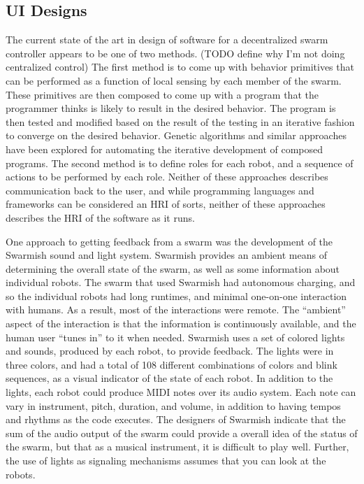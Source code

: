 \documentclass[]{article}
\begin{document}
\subsection{UI Designs}

The current state of the art in design of software for a decentralized swarm controller appears to be one of two methods. (TODO define why I'm not doing centralized control)
The first method is to come up with behavior primitives that can be performed as a function of local sensing by each member of the swarm. 
These primitives are then composed to come up with a program that the programmer thinks is likely to result in the desired behavior. 
The program is then tested and modified based on the result of the testing in an iterative fashion to converge on the desired behavior. 
Genetic algorithms and similar approaches have been explored for automating the iterative development of composed programs. 
The second method is to define roles for each robot, and a sequence of actions to be performed by each role. 
Neither of these approaches describes communication back to the user, and while programming languages and frameworks can be considered an HRI of sorts, neither of these approaches describes the HRI of the software as it runs. 

One approach to getting feedback from a swarm was the development of the Swarmish sound and light system\cite{mclurkin2006speaking}. 
Swarmish provides an ambient means of determining the overall state of the swarm, as well as some information about individual robots. 
The swarm that used Swarmish had autonomous charging, and so the individual robots had long runtimes, and minimal one-on-one interaction with humans. 
As a result, most of the interactions were remote.
The ``ambient'' aspect of the interaction is that the information is continuously available, and the human user ``tunes in'' to it when needed. 
Swarmish uses a set of colored lights and sounds, produced by each robot, to provide feedback. 
The lights were in three colors, and had a total of 108 different combinations of colors and blink sequences, as a visual indicator of the state of each robot. 
In addition to the lights, each robot could produce MIDI notes over its audio system. 
Each note can vary in instrument, pitch, duration, and volume, in addition to having tempos and rhythms as the code executes. 
The designers of Swarmish indicate that the sum of the audio output of the swarm could provide a overall idea of the status of the swarm, but that as a musical instrument, it is difficult to play well. 
Further, the use of lights as signaling mechanisms assumes that you can look at the robots. 
\end{document}
